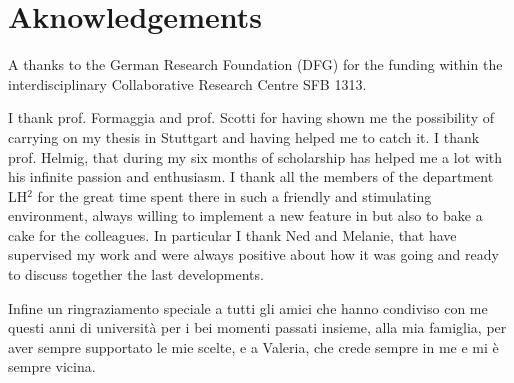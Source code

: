 \chapter*{Aknowledgements}
A thanks to the German Research Foundation (DFG) for the funding within the interdisciplinary Collaborative Research Centre SFB 1313.

I thank prof. Formaggia and prof. Scotti for having shown me the possibility of carrying on my thesis in Stuttgart and having helped me to catch it.
I thank prof. Helmig, that during my six months of scholarship has helped me a lot with his infinite passion and enthusiasm.
I thank all the members of the department LH$^2$ for the great time spent there in such a friendly and stimulating environment, always willing to implement a new feature in \DUMUX but also to bake a cake for the colleagues. In particular I thank Ned and Melanie, that have supervised my work and were always positive about how it was going and ready to discuss together the last developments.

Infine un ringraziamento speciale a tutti gli amici che hanno condiviso con me questi anni di università per i bei momenti passati insieme, alla mia famiglia, per aver sempre supportato le mie scelte, e a Valeria, che crede sempre in me e mi è sempre vicina.
